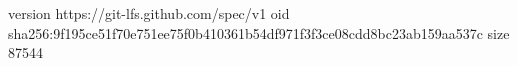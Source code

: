 version https://git-lfs.github.com/spec/v1
oid sha256:9f195ce51f70e751ee75f0b410361b54df971f3f3ce08cdd8bc23ab159aa537c
size 87544
